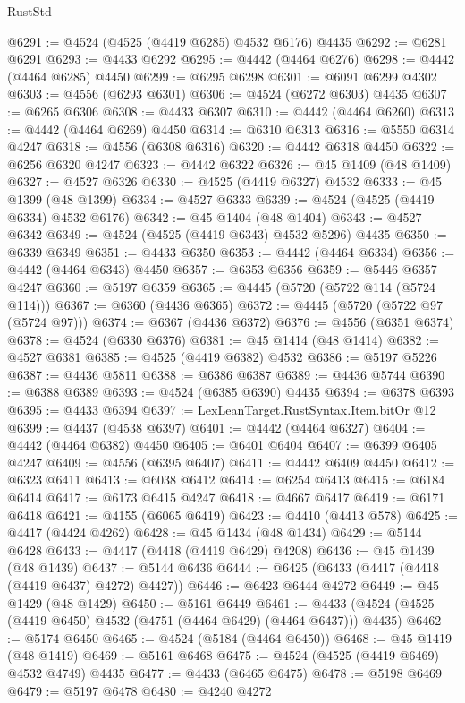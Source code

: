 \begin{lexlean}{RustStd}
\begin{coremodule}
@6291 := @4524 (@4525 (@4419 @6285) @4532 @6176) @4435
@6292 := @6281 @6291
@6293 := @4433 @6292
@6295 := @4442 (@4464 @6276)
@6298 := @4442 (@4464 @6285) @4450
@6299 := @6295 @6298
@6301 := @6091 @6299 @4302
@6303 := @4556 (@6293 @6301)
@6306 := @4524 (@6272 @6303) @4435
@6307 := @6265 @6306
@6308 := @4433 @6307
@6310 := @4442 (@4464 @6260)
@6313 := @4442 (@4464 @6269) @4450
@6314 := @6310 @6313
@6316 := @5550 @6314 @4247
@6318 := @4556 (@6308 @6316)
@6320 := @4442 @6318 @4450
@6322 := @6256 @6320 @4247
@6323 := @4442 @6322
@6326 := @45 @1409 (@48 @1409)
@6327 := @4527 @6326
@6330 := @4525 (@4419 @6327) @4532
@6333 := @45 @1399 (@48 @1399)
@6334 := @4527 @6333
@6339 := @4524 (@4525 (@4419 @6334) @4532 @6176)
@6342 := @45 @1404 (@48 @1404)
@6343 := @4527 @6342
@6349 := @4524 (@4525 (@4419 @6343) @4532 @5296) @4435
@6350 := @6339 @6349
@6351 := @4433 @6350
@6353 := @4442 (@4464 @6334)
@6356 := @4442 (@4464 @6343) @4450
@6357 := @6353 @6356
@6359 := @5446 @6357 @4247
@6360 := @5197 @6359
@6365 := @4445 (@5720 (@5722 @114 (@5724 @114)))
@6367 := @6360 (@4436 @6365)
@6372 := @4445 (@5720 (@5722 @97 (@5724 @97)))
@6374 := @6367 (@4436 @6372)
@6376 := @4556 (@6351 @6374)
@6378 := @4524 (@6330 @6376)
@6381 := @45 @1414 (@48 @1414)
@6382 := @4527 @6381
@6385 := @4525 (@4419 @6382) @4532
@6386 := @5197 @5226
@6387 := @4436 @5811
@6388 := @6386 @6387
@6389 := @4436 @5744
@6390 := @6388 @6389
@6393 := @4524 (@6385 @6390) @4435
@6394 := @6378 @6393
@6395 := @4433 @6394
@6397 := LexLeanTarget.RustSyntax.Item.bitOr @12
@6399 := @4437 (@4538 @6397)
@6401 := @4442 (@4464 @6327)
@6404 := @4442 (@4464 @6382) @4450
@6405 := @6401 @6404
@6407 := @6399 @6405 @4247
@6409 := @4556 (@6395 @6407)
@6411 := @4442 @6409 @4450
@6412 := @6323 @6411
@6413 := @6038 @6412
@6414 := @6254 @6413
@6415 := @6184 @6414
@6417 := @6173 @6415 @4247
@6418 := @4667 @6417
@6419 := @6171 @6418
@6421 := @4155 (@6065 @6419)
@6423 := @4410 (@4413 @578)
@6425 := @4417 (@4424 @4262)
@6428 := @45 @1434 (@48 @1434)
@6429 := @5144 @6428
@6433 := @4417 (@4418 (@4419 @6429) @4208)
@6436 := @45 @1439 (@48 @1439)
@6437 := @5144 @6436
@6444 := @6425 (@6433 (@4417 (@4418 (@4419 @6437) @4272) @4427))
@6446 := @6423 @6444 @4272
@6449 := @45 @1429 (@48 @1429)
@6450 := @5161 @6449
@6461 := @4433 (@4524 (@4525 (@4419 @6450) @4532 (@4751 (@4464 @6429) (@4464 @6437))) @4435)
@6462 := @5174 @6450
@6465 := @4524 (@5184 (@4464 @6450))
@6468 := @45 @1419 (@48 @1419)
@6469 := @5161 @6468
@6475 := @4524 (@4525 (@4419 @6469) @4532 @4749) @4435
@6477 := @4433 (@6465 @6475)
@6478 := @5198 @6469
@6479 := @5197 @6478
@6480 := @4240 @4272

\end{coremodule}
\end{lexlean}
